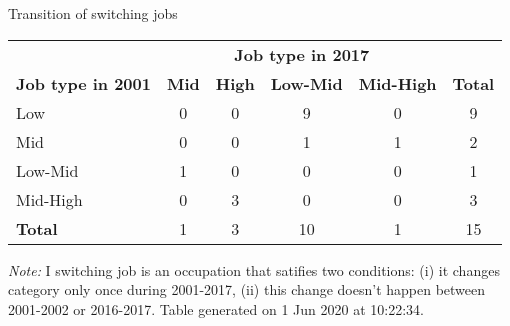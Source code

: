 \begin{center}
\begin{threeparttable}[!h]
\caption{Transition of switching jobs}
\begin{tabular}{lccccc}
\toprule
\toprule
& \multicolumn{4}{c}{\textbf{Job type in 2017}} & \\ \cline{2-5}
\textbf{Job type in 2001}&\multicolumn{1}{c}{\textbf{Mid}}&\multicolumn{1}{c}{\textbf{High}}&\multicolumn{1}{c}{\textbf{Low-Mid}}&\multicolumn{1}{c}{\textbf{Mid-High}}&\multicolumn{1}{c}{\textbf{Total}} \\
\midrule
\hline
Low&0&0&9&0&9 \\
Mid&0&0&1&1&2 \\
Low-Mid&1&0&0&0&1 \\
Mid-High&0&3&0&0&3 \\
\midrule \textbf{Total}&1&3&10&1&15 \\
\bottomrule
\bottomrule
\end{tabular}
\begin{tablenotes}
\item \footnotesize \textit{Note:} I switching job is an occupation that satifies two conditions: (i) it changes category only once during 2001-2017, (ii) this change doesn't happen between 2001-2002 or 2016-2017. Table generated on  1 Jun 2020 at 10:22:34.
\end{tablenotes}
\end{threeparttable}
\end{center}
